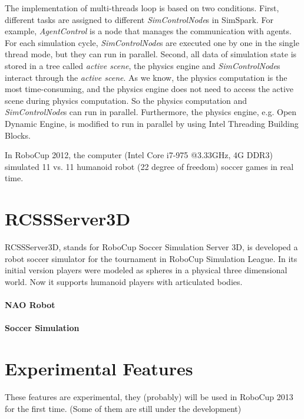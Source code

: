 \documentclass{llncs}
\begin{document}
The implementation of multi-threads loop is based on two conditions.
First, different tasks are assigned to different \textit{SimControlNode}s in SimSpark.
For example, \textit{AgentControl} is a node that manages the communication with agents.
For each simulation cycle, \textit{SimControlNode}s are executed one by one in the single thread mode, but they can run in parallel.
Second, all data of simulation state is stored in a tree called \textit{active scene},
the physics engine and \textit{SimControlNode}s interact through the \textit{active scene}.
As we know, the physics computation is the most time-consuming, and the physics engine does not need to access the active scene during physics computation.
So the physics computation and \textit{SimControlNode}s can run in parallel.
Furthermore, the physics engine, e.g. Open Dynamic Engine\cite{Smith:ODE}, is modified to run in parallel by using Intel Threading Building Blocks\cite{tbb}.

In RoboCup 2012, the computer (Intel Core i7-975 @3.33GHz, 4G DDR3) simulated 11 vs. 11 humanoid robot (22 degree of freedom) soccer games in real time. 

\section{RCSSServer3D}
\label{s:rcssserver3d}

RCSSServer3D, stands for RoboCup Soccer Simulation Server 3D, is developed a robot soccer simulator for the tournament in RoboCup Simulation League.
In its initial version players were modeled as spheres in a physical three dimensional world. Now it supports humanoid players with articulated bodies.


\paragraph{NAO Robot}
\paragraph{Soccer Simulation}

\section{Experimental Features}
\label{s:ongoing}
These features are experimental, they (probably) will be used in RoboCup 2013 for the first time. (Some of them are still under the development)
\end{document}
